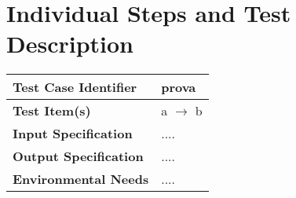 \section{Individual Steps and Test Description}

{\renewcommand{\arraystretch}{1.2}%

\begin{tabularx}{\textwidth}{l X}
    \hline 
    \textbf{Test Case Identifier} & prova\\ 
    \hline 
    
    \textbf{Test Item(s)} & a $\rightarrow$ b\\
    \hline 
    
    \textbf{Input Specification} & ....\\
    \hline 
    
    \textbf{Output Specification} & .... \\
    \hline 
    
    \textbf{Environmental Needs} & ....  \\
    \hline
\end{tabularx}
\newline 




}
